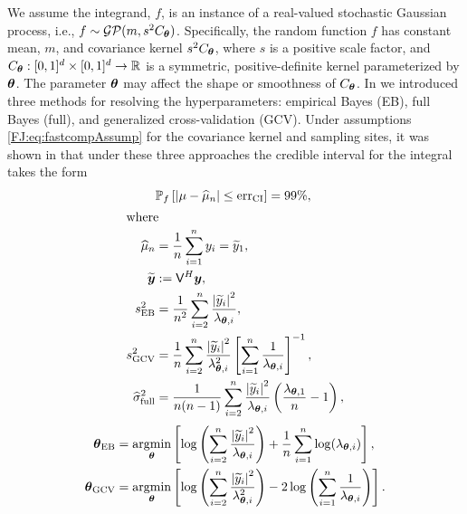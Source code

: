 \documentclass[graybox,footinfo]{svmult}
\newcommand{\abs}[1]{\left\lvert #1 \right\rvert} %
\begin{document}
We assume the integrand, $f$, is an instance of a real-valued stochastic Gaussian process, i.e., $f \sim \mathcal{GP}(m,s^2 C_{\boldsymbol{\theta}})$.  Specifically, the random function $f$ has constant mean, $m$, and covariance kernel $s^2C_{\boldsymbol{\theta}}$, where $s$ is a positive scale factor, and $C_{\boldsymbol{\theta}}: [0,1]^d \times [0,1]^d \to \mathbb{R} $ is a symmetric, positive-definite kernel parameterized by ${\boldsymbol{\theta}}$.  The parameter ${\boldsymbol{\theta}}$ may affect the shape or smoothness of $C_{\boldsymbol{\theta}}$.  In \cite{RatHic19a} we introduced three methods for resolving the hyperparameters:  empirical Bayes (EB), full Bayes (full), and generalized cross-validation (GCV).  Under assumptions \eqref{FJ:eq:fastcompAssump} for the covariance kernel and sampling sites, it was shown in \cite[Theorem 2]{RatHic19a} that under these three approaches the credible interval for the integral takes the form
		\begin{align}
			\label{FJ:eqn:CI}
			&\mathbb{P}_f \left[
			|\mu-\widehat{\mu}_n| \leq \textup{err}_{\textup{CI}}
			\right] = 99\%, \\
			\intertext{where}
			\label{FJ:muhatGCV-FB-MLE-Simple}
			\widehat{\mu}_n &= \frac 1n \sum_{i=1}^n y_i = \widetilde{y}_1, \\
		\nonumber 
		\widetilde{\bsy} &:= \mathsf{V}^H \bsy, \\
		\nonumber
		s^2_\textup{EB} 
		& =
		\frac{1}{n^2} 
		\sum_{i=2}^n \frac{\abs{\widetilde{y}_i}^2}{\lambda_{\bstheta,i}},  \\
		\nonumber 
		s^2_{\textup{GCV}} & =  \frac 1{n} \sum_{i=2}^n \frac{\abs{\widetilde{y}_i}^2}{\lambda_{\bstheta,i}^2}  \left [ \sum_{i=1}^n \frac{1}{\lambda_{\bstheta,i}} \right]^{-1}, \\
		\nonumber
		\widehat{\sigma}^2_{\textup{full}} &= \frac{1}{n(n-1)} \sum_{i=2}^n \frac{\abs{\widetilde{y}_i}^2}{\lambda_{\bstheta,i}}  \left(\frac{\lambda_{\bstheta,1}}{n}  - 1  \right), 
		\end{align}
	\begin{subequations}
		\label{FJ:eqn:fastTheta}
		\begin{align}
		\label{FJ:eqn:fastThetaEB}
		\bstheta_\textup{EB}
		&= 
		\argmin_{\bstheta}
		\left[
		\log\left(
		\sum_{i=2}^n \frac{\abs{\widetilde{y}_i}^2}{\lambda_{\bstheta,i}}
		\right) 
		+ \frac{1}{n}\sum_{i=1}^n \log(\lambda_{\bstheta,i})
		\right],\\
		\label{FJ:eqn:fastThetaGCV} 
		\bstheta_{\textup{GCV}} 
		&= \argmin_\bstheta \left[ \log \left ( \sum_{i=2}^n \frac{\abs{\widetilde{y}_i}^2}{\lambda_{\bstheta,i}^2} 
		\right)  
		-2\log\left( \sum_{i=1}^n \frac{1}{\lambda_{\bstheta,i}} \right)
		\right].
		\end{align}
	\end{subequations}
\end{document}
